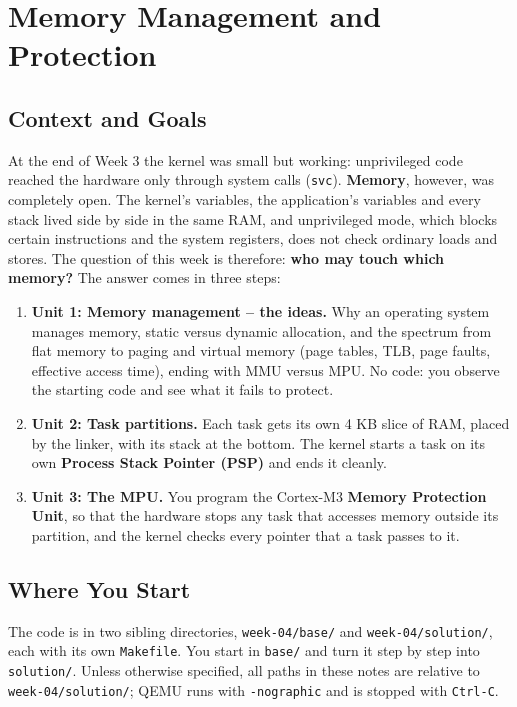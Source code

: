 \chapter{Memory Management and Protection}

\section{Context and Goals}

At the end of Week 3 the kernel was small but working: unprivileged code reached the hardware only through system calls (\texttt{svc}). \textbf{Memory}, however, was completely open. The kernel's variables, the application's variables and every stack lived side by side in the same RAM, and unprivileged mode, which blocks certain instructions and the system registers, does not check ordinary loads and stores. The question of this week is therefore: \textbf{who may touch which memory?} The answer comes in three steps:

\begin{enumerate}
    \item \textbf{Unit 1: Memory management -- the ideas.} Why an operating system manages memory, static versus dynamic allocation, and the spectrum from flat memory to paging and virtual memory (page tables, TLB, page faults, effective access time), ending with MMU versus MPU. No code: you observe the starting code and see what it fails to protect.
    \item \textbf{Unit 2: Task partitions.} Each task gets its own 4 KB slice of RAM, placed by the linker, with its stack at the bottom. The kernel starts a task on its own \textbf{Process Stack Pointer (PSP)} and ends it cleanly.
    \item \textbf{Unit 3: The MPU.} You program the Cortex-M3 \textbf{Memory Protection Unit}, so that the hardware stops any task that accesses memory outside its partition, and the kernel checks every pointer that a task passes to it.
\end{enumerate}

\section{Where You Start}

The code is in two sibling directories, \texttt{week-04/base/} and \texttt{week-04/solution/}, each with its own \texttt{Makefile}. You start in \texttt{base/} and turn it step by step into \texttt{solution/}. Unless otherwise specified, all paths in these notes are relative to \texttt{week-04/solution/}; QEMU runs with \texttt{-nographic} and is stopped with \texttt{Ctrl-C}.

